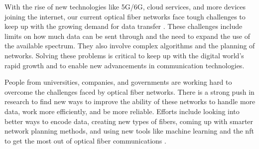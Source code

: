 With the rise of new technologies like 5G/6G, cloud services, and more devices joining the internet, our current optical fiber networks face tough challenges to keep up with the growing demand for data transfer \cite{huawei2023}. These challenges include limits on how much data can be sent through and the need to expand the use of the available spectrum. They also involve complex algorithms and the planning of networks. Solving these problems is critical to keep up with the digital world's rapid growth and to enable new advancements in communication technologies.



People from universities, companies, and governments are working hard to overcome the challenges faced by optical fiber networks. There is a strong push in research to find new ways to improve the ability of these networks to handle more data, work more efficiently, and be more reliable. Efforts include looking into better ways to encode data, creating new types of fibers, coming up with smarter network planning methods, and using new tools like machine learning and the \acrfull{nft} to get the most out of optical fiber communications \cite{turitsyn2017nonlinear}.




